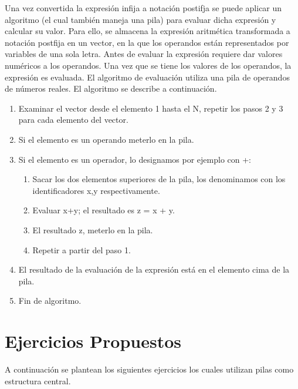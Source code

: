 Una vez convertida la expresión infija a notación postifja se puede aplicar un algoritmo (el cual también maneja una pila) para evaluar dicha expresión y calcular su valor.  Para ello, se almacena la expresión aritmética transformada a notación postfija en un vector, en la que los operandos están representados por variables de una sola letra. Antes de evaluar la expresión requiere dar valores numéricos a los operandos. Una vez que se tiene los valores de los operandos, la expresión es evaluada. El algoritmo de evaluación utiliza una pila de operandos de números reales. El algoritmo se describe a continuación.
\begin{enumerate}
	\item Examinar el vector desde el elemento 1 hasta el N, repetir los pasos 2 y 3 para cada elemento del vector.
	\item Si el elemento es un operando meterlo en la pila.
	\item Si el elemento es un operador, lo designamos por ejemplo con +:
	\begin{enumerate}
		\item Sacar los dos elementos superiores de la pila, los denominamos con los identificadores x,y respectivamente.
		\item Evaluar x+y; el resultado es z = x + y.
		\item El resultado z, meterlo en la pila.
		\item Repetir a partir del paso 1.
	\end{enumerate}
	\item El resultado de la evaluación de la expresión está en el elemento cima de la       pila.
	\item Fin de algoritmo.
\end{enumerate}


\section{Ejercicios Propuestos}
A continuación se plantean los siguientes ejercicios los cuales utilizan pilas como estructura central.


